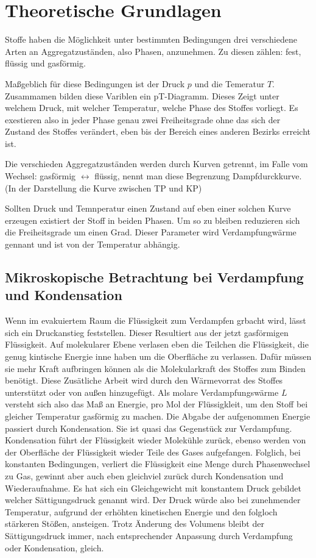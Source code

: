 \section{Theoretische Grundlagen}
Stoffe haben die Möglichkeit unter bestimmten Bedingungen drei verschiedene Arten an Aggregatzuständen, also Phasen, anzunehmen.
Zu diesen zählen: fest, flüssig und gasförmig.

Maßgeblich für diese Bedingungen ist der Druck $p$ und die Temeratur $T$.  Zusammamen bilden diese Variblen
ein pT-Diagramm. Dieses Zeigt unter welchem Druck, mit welcher Temperatur,  welche Phase des Stoffes vorliegt.
Es exestieren also in jeder Phase genau zwei Freiheitsgrade ohne das sich der Zustand des Stoffes verändert, eben bis der Bereich eines anderen Bezirks erreicht ist.



Die verschieden Aggregatzuständen werden durch Kurven getrennt, im Falle vom Wechsel: gasförmig $\longleftrightarrow$ flüssig,
nennt man diese Begrenzung Dampfdurckkurve. (In der Darstellung %
die Kurve zwischen TP und KP)

Sollten Druck und Temnperatur einen Zustand auf eben einer solchen Kurve erzeugen existiert der Stoff in beiden Phasen.
Um so zu bleiben reduzieren sich die Freiheitsgrade um einen Grad. Dieser Parameter wird Verdampfungwärme gennant und ist von der Temperatur
abhängig. 

\subsection{Mikroskopische Betrachtung bei Verdampfung und Kondensation}
Wenn im evakuiertem Raum die Flüssigkeit zum Verdampfen grbacht wird, lässt sich ein Druckanstieg feststellen.
Dieser Resultiert aus der jetzt gasförmigen Flüssigkeit. Auf molekularer Ebene verlasen eben die Teilchen die Flüssigkeit, die genug kintische Energie 
inne haben um die Oberfläche zu verlassen. Dafür müssen sie mehr Kraft aufbringen können als die Molekularkraft des Stoffes zum Binden benötigt.
Diese Zusätliche Arbeit wird durch den Wärmevorrat des Stoffes unterstützt oder von außen hinzugefügt.
Als molare Verdampfungswärme $L$ versteht sich also das Maß an Energie, pro Mol der Flüssigkleit, um den Stoff bei gleicher Temperatur gasförmig zu machen.
Die Abgabe der aufgenommen Energie passiert durch Kondensation. Sie ist quasi das Gegenstück zur Verdampfung.
Kondensation führt der Flüssigkeit wieder Molekühle zurück, ebenso werden von der Oberfläche der Flüssigkeit wieder Teile des Gases aufgefangen.
Folglich, bei konstanten Bedingungen, verliert die Flüssigkeit eine Menge durch Phasenwechsel zu Gas, gewinnt aber auch eben gleichviel 
zurück durch Kondensation und Wiederaufnahme. Es hat sich ein Gleichgewicht mit konstantem Druck gebildet welcher Sättigungsdruck genannt wird.
Der Druck würde also bei zunehmender Temperatur, aufgrund der erhöhten kinetischen Energie und den folgloch stärkeren Stößen, ansteigen.
Trotz Änderung des Volumens bleibt der Sättigungsdruck immer, nach entsprechender Anpassung durch Verdampfung oder Kondensation, gleich.

